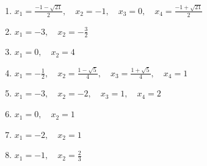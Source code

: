 \documentclass[11pt,a4paper]{article}
\begin{document}
\begin{enumerate}
\item \(\displaystyle x_{1}=\frac{-1-\sqrt{21}}{2},\quad x_{2}=-1,\quad x_{3}=0,\quad x_{4}=\frac{-1+\sqrt{21}}{2}\)
\item \(\displaystyle x_{1}=-3,\quad x_{2}=-\frac{3}{2}\)
\item \(\displaystyle x_{1}=0,\quad x_{2}=4\)
\item \(\displaystyle x_{1}=-\frac{1}{2},\quad x_{2}=\frac{1-\sqrt{5}}{4},\quad x_{3}=\frac{1+\sqrt{5}}{4},\quad x_{4}=1\)
\item \(\displaystyle x_{1}=-3,\quad x_{2}=-2,\quad x_{3}=1,\quad x_{4}=2\)
\item \(\displaystyle x_{1}=0,\quad x_{2}=1\)
\item \(\displaystyle x_{1}=-2,\quad x_{2}=1\)
\item \(\displaystyle x_{1}=-1,\quad x_{2}=\frac{2}{3}\)
\end{enumerate}
\endgroup
\clearpage
\end{document}
